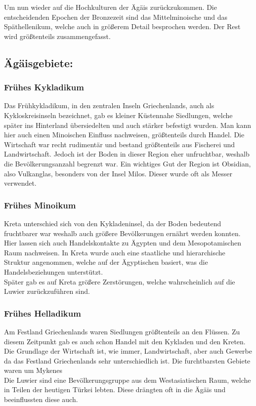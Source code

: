 \documentclass{article}
\begin{document}
	Um nun wieder auf die Hochkulturen der Ägäis zurückzukommen. Die entscheidenden Epochen der Bronzezeit sind das Mittelminoische und das Späthellenikum, welche auch in größerem Detail besprochen werden. Der Rest wird größtenteils zusammengefasst.\\
	\subsection{Ägäisgebiete:}
	\subsubsection{Frühes Kykladikum}
	Das Frühkykladikum, in den zentralen Inseln Griechenlands, auch als Kykloskreisinseln bezeichnet, gab es kleiner Küstennahe Siedlungen, welche später ins Hinterland übersiedelten und auch stärker befestigt wurden. Man kann hier auch einen Minoischen Einfluss nachweisen, größtenteils durch Handel. Die Wirtschaft war recht rudimentär und bestand größtenteils aus Fischerei und Landwirtschaft. Jedoch ist der Boden in dieser Region eher unfruchtbar, weshalb die Bevölkerungsanzahl begrenzt war. Ein wichtiges Gut der Region ist Obsidian, also Vulkanglas, besonders von der Insel Milos. Dieser wurde oft als Messer verwendet. \\
	\subsubsection{Frühes Minoikum}
	Kreta unterschied sich von den Kykladeninsel, da der Boden bedeutend fruchtbarer war weshalb auch größere Bevölkerungen ernährt werden konnten. Hier lassen sich auch Handelskontakte zu Ägypten und dem Mesopotamischen Raum nachweisen. In Kreta wurde auch eine staatliche und hierarchische Struktur angenommen, welche auf der Ägyptischen basiert, was die Handelsbeziehungen unterstützt. \\
	Später gab es auf Kreta größere Zerstörungen, welche wahrscheinlich auf die Luwier zurückzuführen sind. \\
	\subsubsection{Frühes Helladikum}
	Am Festland Griechenlands waren Siedlungen größtenteils an den Flüssen. Zu diesem Zeitpunkt gab es auch schon Handel mit den Kykladen und den Kreten. Die Grundlage der Wirtschaft ist, wie immer, Landwirtschaft, aber auch Gewerbe da das Festland Griechenlands sehr unterschiedlich ist. Die furchtbarsten Gebiete waren um Mykenes \\
	Die Luwier sind eine Bevölkerungsgruppe aus dem Westasiatischen Raum, welche in Teilen der heutigen Türkei lebten. Diese drängten oft in die Ägäis und beeinflussten diese auch. \\
\end{document}

